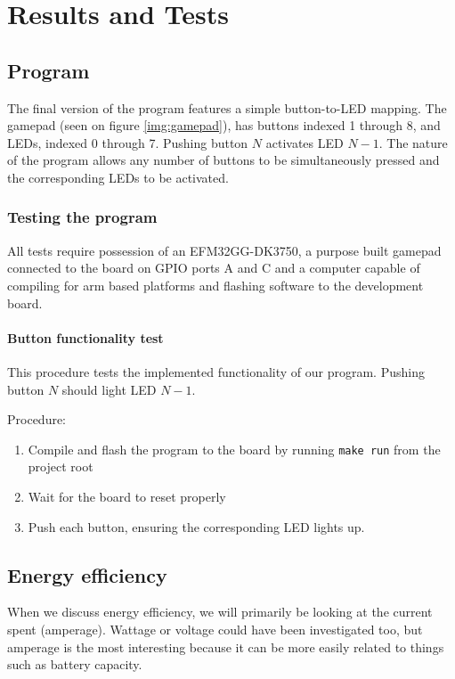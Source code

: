 \chapter{Results and Tests}
\label{chap:results}
\section{Program}
The final version of the program features a simple button-to-LED mapping. The gamepad (seen on figure \ref{img:gamepad}), has buttons indexed 1 through 8, and LEDs, indexed 0 through 7. Pushing button $N$ activates LED $N-1$. The nature of the program allows any number of buttons to be simultaneously pressed and the corresponding LEDs to be activated.

\subsection{Testing the program}
All tests require possession of an EFM32GG-DK3750, a purpose built gamepad connected to the board on GPIO ports A and C and a computer capable of compiling for arm based platforms and flashing software to the development board.

\subsubsection{Button functionality test}

This procedure tests the implemented functionality of our program. Pushing button $N$ should light LED $N-1$.

Procedure:

\begin{enumerate}
\item Compile and flash the program to the board by running \texttt{make run} from the project root
\item Wait for the board to reset properly
\item Push each button, ensuring the corresponding LED lights up.
\end{enumerate}


\section{Energy efficiency}
When we discuss energy efficiency, we will primarily be looking at the current spent (amperage). Wattage or voltage could have been investigated too, but amperage is the most interesting because it can be more easily related to things such as battery capacity.

